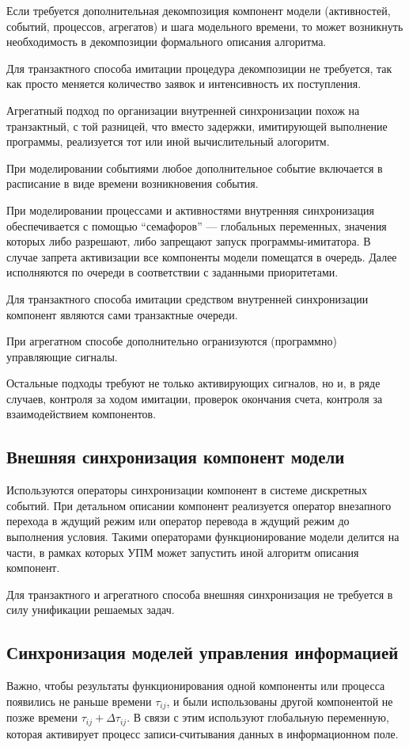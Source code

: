 \documentclass[12pt]{article}
\begin{document}
Если требуется дополнительная декомпозиция компонент модели (активностей, событий, процессов, агрегатов) и шага модельного времени, то может возникнуть необходимость в декомпозиции формального описания алгоритма.

Для транзактного способа имитации процедура декомпозиции не требуется, так как просто меняется количество заявок и интенсивность их поступления. 

Агрегатный подход по организации внутренней синхронизации похож на транзактный, с той разницей, что вместо задержки, имитирующей выполнение программы, реализуется тот или иной вычислительный алогоритм.

При моделировании событиями любое дополнительное событие включается в расписание в виде времени возникновения события.

При моделировании процессами и активностями внутренняя синхронизация обеспечивается с помощью \enquote{семафоров} --- глобальных переменных, значения которых либо разрешают, либо запрещают запуск программы-имитатора. В случае запрета активизации все компоненты модели помещатся в очередь. Далее исполняются по очереди в соответствии с заданными приоритетами.

Для транзактного способа имитации средством внутренней синхронизации компонент являются сами транзактные очереди.

При агрегатном способе дополнительно огранизуются (программно) управляющие сигналы.

Остальные подходы требуют не только активирующих сигналов, но и, в ряде случаев, контроля за ходом имитации, проверок окончания счета, контроля за взаимодействием компонентов.

\subsection{Внешняя синхронизация компонент модели}
Используются операторы синхронизации компонент в системе дискретных событий. При детальном описании компонент реализуется оператор внезапного перехода в ждущий режим или оператор перевода в ждущий режим до выполнения условия. Такими операторами функционирование модели делится на части, в рамках которых УПМ может запустить иной алгоритм описания компонент.

Для транзактного и агрегатного способа внешняя синхронизация не требуется в силу унификации решаемых задач.

\subsection{Синхронизация моделей управления информацией}
Важно, чтобы результаты функционирования одной компоненты или процесса появились не раньше времени $\tau_{ij}$, и были использованы другой компонентой не позже времени $\tau_{ij} + \Delta \tau_{ij}$. В связи с этим используют глобальную переменную, которая активирует процесс записи-считывания данных в информационном поле.
\end{document}
